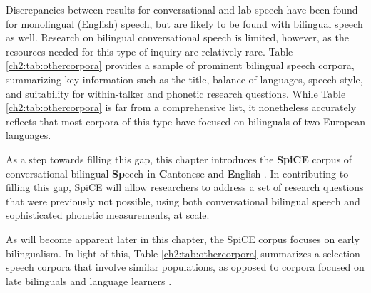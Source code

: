 Discrepancies between results for conversational and lab speech have been found for monolingual (English) speech, but are likely to be found with bilingual speech as well. Research on bilingual conversational speech is limited, however, as the resources needed for this type of inquiry are relatively rare. Table \ref{ch2:tab:othercorpora} provides a sample of prominent bilingual speech corpora, summarizing key information such as the title, balance of languages, speech style, and suitability for within-talker and phonetic research questions. While Table \ref{ch2:tab:othercorpora} is far from a comprehensive list, it nonetheless accurately reflects that most corpora of this type have focused on bilinguals of two European languages.

As a step towards filling this gap, this chapter introduces the \textbf{SpiCE} corpus of conversational bilingual \textbf{Sp}eech \textbf{i}n \textbf{C}antonese and \textbf{E}nglish \citep{johnson_2021_spice}. In contributing to filling this gap, SpiCE will allow researchers to address a set of research questions that were previously not possible, using both conversational bilingual speech and sophisticated phonetic measurements, at scale. 

As will become apparent later in this chapter, the SpiCE corpus focuses on early bilingualism. In light of this, Table \ref{ch2:tab:othercorpora} summarizes a selection speech corpora that involve similar populations, as opposed to corpora focused on late bilinguals and language learners \citep[e.g.,][]{bradlow_2011_allsstar}.

